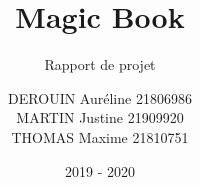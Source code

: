 \documentclass[report]{BetterDocument}
\title{Magic Book}
\subtitle{Rapport de projet}
\author{DEROUIN Auréline 21806986\\
	MARTIN Justine 21909920\\
	THOMAS Maxime 21810751
}
\date{2019 - 2020}
\institute{Unicaen}
\begin{document}
	\pageDeGarde

	\tableDesMatieres

	

	

	

	

	

	

	
\end{document}
